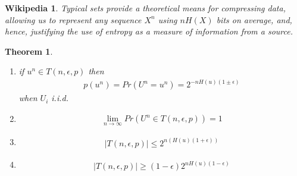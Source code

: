 \documentclass{article}
\newtheorem{theorem}{Theorem}[section]
\newtheorem*{wikipedia}{Wikipedia}
\theoremstyle{definition} %
\begin{document}
\begin{wikipedia}
  Typical sets provide a theoretical means for compressing data, allowing us to represent any sequence $X^n$ using $nH(X)$ bits on average, and, hence, justifying the use of entropy as a measure of information from a source.
\end{wikipedia}

\begin{theorem}
  \begin{enumerate}
    \item if $u^n \in T(n, \epsilon, p)$ then
    \begin{align*}
      p(u^n) = Pr(U^n = u^n) = 2^{-n H(u)(1 \pm \epsilon)}
    \end{align*}
    when $U_i$ i.i.d.
    \item
    \begin{align*}
      \lim_{n \rightarrow \infty} Pr(U^n \in T(n, \epsilon, p)) = 1
    \end{align*}
    \item
    \begin{align*}
      |T(n, \epsilon, p)| \leq 2^{n (H(u)(1 + \epsilon))}
    \end{align*}
    \item
    \begin{align*}
      |T(n, \epsilon, p)| \geq (1-\epsilon) 2^{n H(u)(1-\epsilon)}
    \end{align*}
  \end{enumerate}
\end{theorem}
\end{document}

